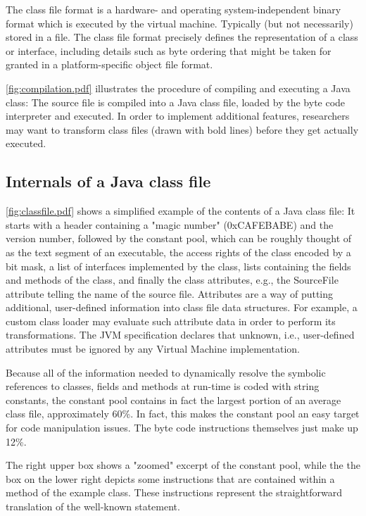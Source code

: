 The class file format is a hardware- and operating system-independent binary
format which is executed by the virtual machine. Typically (but not necessarily)
stored in a file. The class file format precisely defines the representation of a
class or interface, including details such as byte ordering that might be taken
for granted in a platform-specific object file format.

\autoref{fig:compilation.pdf} illustrates the procedure of compiling and
executing a Java class: The source file is compiled into a Java class file,
loaded by the byte code interpreter and executed. In order to implement
additional features, researchers may want to transform class files (drawn with
bold lines) before they get actually executed.

\subsection{Internals of a Java class file~\cite{BCEL}}
\autoref{fig:classfile.pdf} shows a simplified example of the contents of a
Java class file: It starts with a header containing a "magic number"
(0xCAFEBABE) and the version number, followed by the constant pool, which can be
roughly thought of as the text segment of an executable, the access rights of
the class encoded by a bit mask, a list of interfaces implemented by the class,
lists containing the fields and methods of the class, and finally the class
attributes, e.g., the SourceFile attribute telling the name of the source file.
Attributes are a way of putting additional, user-defined information into class
file data structures. For example, a custom class loader may evaluate such
attribute data in order to perform its transformations. The JVM specification
declares that unknown, i.e., user-defined attributes must be ignored by any
Virtual Machine implementation.

Because all of the information needed to dynamically resolve the symbolic
references to classes, fields and methods at run-time is coded with string
constants, the constant pool contains in fact the largest portion of an average
class file, approximately 60\%. In fact, this makes the constant pool an easy
target for code manipulation issues. The byte code instructions themselves just
make up 12\%. 

The right upper box shows a "zoomed" excerpt of the constant pool, while the
the box on the lower right depicts some instructions that are contained within a method
of the example class. These instructions represent the straightforward
translation of the well-known  statement.

